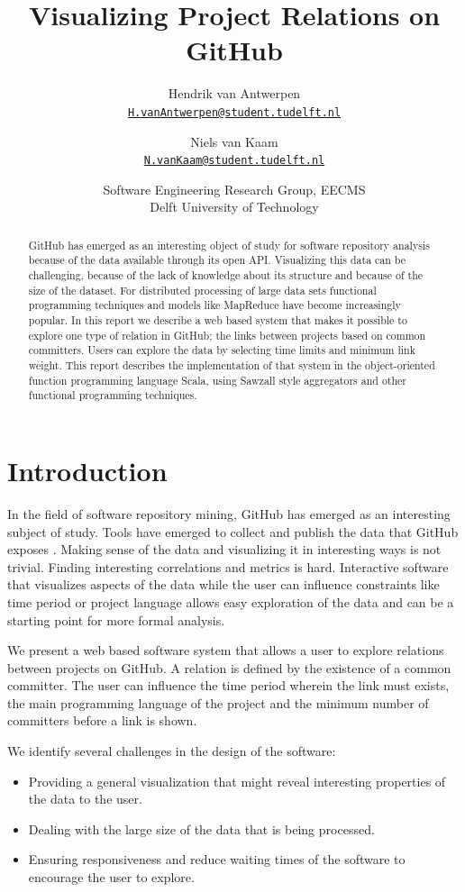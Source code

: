 \documentclass[10pt,a4paper]{article}
\title{Visualizing Project Relations on GitHub}
\author{
    Hendrik van Antwerpen\\{\small\href{mailto:H.vanAntwerpen@student.tudelft.nl}{\nolinkurl{H.vanAntwerpen@student.tudelft.nl}}}
  \and
    Niels van Kaam\\{\small\href{mailto:N.vanKaam@student.tudelft.nl}{\nolinkurl{N.vanKaam@student.tudelft.nl}}}
}
\date{Software Engineering Research Group, EECMS\\Delft University of Technology}
\begin{document}
\maketitle

\begin{abstract}
GitHub has emerged as an interesting object of study for software repository analysis because of the data available through its open API. Visualizing this data can be challenging, because of the lack of knowledge about its structure and because of the size of the dataset. For distributed processing of large data sets functional programming techniques and models like MapReduce have become increasingly popular. In this report we describe a web based system that makes it possible to explore one type of relation in GitHub; the links between projects based on common committers. Users can explore the data by selecting time limits and minimum link weight. This report describes the implementation of that system in the object-oriented function programming language Scala, using Sawzall style aggregators and other functional programming techniques.
\end{abstract}

\section{Introduction}

In the field of software repository mining, GitHub has emerged as an interesting subject of study. Tools have emerged to collect and publish the data that GitHub exposes \citep{gousios2012ghtorrent}. Making sense of the data and visualizing it in interesting ways is not trivial. Finding interesting correlations and metrics is hard. Interactive software that visualizes aspects of the data while the user can influence constraints like time period or project language allows easy exploration of the data and can be a starting point for more formal analysis.

We present a web based software system that allows a user to explore relations between projects on GitHub. A relation is defined by the existence of a common committer. The user can influence the time period wherein the link must exists, the main programming language of the project and the minimum number of committers before a link is shown.

We identify several challenges in the design of the software:
\begin{itemize}
    \item Providing a general visualization that might reveal interesting properties of the data to the user.
    \item Dealing with the large size of the data that is being processed.
    \item Ensuring responsiveness and reduce waiting times of the software to encourage the user to explore.
\end{itemize}
\end{document}
